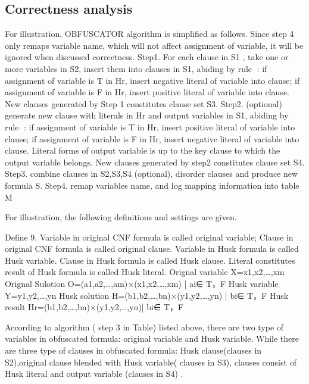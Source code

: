 \documentclass[runningheads,a4paper]{llncs}
\begin{document}
\subsection{Correctness analysis}
For illustration, OBFUSCATOR algorithm is simplified as follows. Since step 4 only remaps variable name, which will not affect assignment of variable, it will be ignored when discussed correctness.
\newline Step1. For each clause in S1 , take one or more variables in S2, insert them into clauses in S1, abiding by rule : if assignment of variable is T in Hr, insert negative literal of variable into clause; if assignment of variable is F in Hr, insert positive literal of variable into clause. New clauses generated by Step 1 constitutes clause set S3.
\newline Step2. (optional) generate new clause with literals in Hr and output variables in S1, abiding by rule : if assignment of variable is T in Hr, insert positive literal of variable into clause; if assignment of variable is F in Hr, insert negative literal of variable into clause. Literal forms of output variable is up to the key clause to which the output variable belongs. New clauses generated by step2 constitutes clause set S4.
\newline Step3. combine clauses in S2,S3,S4 (optional), disorder clauses and produce new formula S.
\newline Step4. remap variables name, and log mapping information into table M 

For illustration, the following definitions and settings are given.

Define 9. Variable in original CNF formula is called original variable; Clause in original CNF formula is called original clause. Variable in Husk formula is called Husk variable. Clause in Husk formula is called Husk clause. Literal constitutes result of Husk formula is called Husk literal.
\newline Orignal variable	X={x1,x2,…,xm}
\newline Orignal Sulotion	O={(a1,a2,…,am)×(x1,x2,…,xm) | ai∈ {T，F}}
\newline Husk variable  	Y={y1,y2,…,yn }
\newline Husk solution	        H={(b1,b2,…,bn)×(y1,y2,…,yn) | bi∈ {T，F}}
\newline Husk result	        Hr={(b1,b2,…,bn)×(y1,y2,…,yn)| bi∈ {T，F}}

According to algorithm ( step 3 in Table) listed above, there are two type of variables in obfuscated formula: original variable and Husk variable. While there are three type of clauses in obfuscated formula: Husk clause(clauses in S2),original clause blended with Husk variable( clauses in S3), clauses consist of Husk literal and output variable (clauses in S4) .
\end{document}
